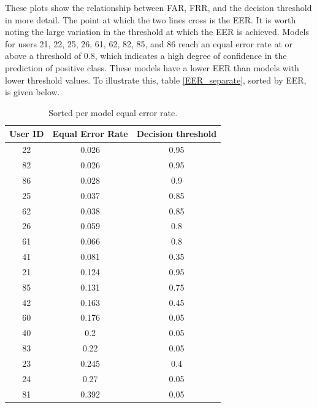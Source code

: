 These plots show the relationship between FAR, FRR, and the decision threshold in more detail. The point at which the two lines cross is the EER. It is worth noting the large variation in the threshold at which the EER is achieved. Models for users 21, 22, 25, 26, 61, 62, 82, 85, and 86 reach an equal error rate at or above a threshold of 0.8, which indicates a high degree of confidence in the prediction of positive class. These models have a lower EER than models with lower threshold values. To illustrate this, table \ref{EER_separate}, sorted by EER, is given below.

\begin{center}
	\begin{table}[H]
		\begin{center}
			\begin{tabular}{ |c|c|c| } 
				\hline
				User ID & Equal Error Rate & Decision threshold \\
				\hline
				\hline
				22 & 0.026 & 0.95 \\
				\hline
				82 & 0.026 & 0.95 \\
				\hline
				86 & 0.028 & 0.9 \\
				\hline
				25 & 0.037 & 0.85 \\
				\hline
				62 & 0.038 & 0.85 \\
				\hline
				26 & 0.059 & 0.8 \\
				\hline
				61 & 0.066 & 0.8 \\
				\hline
				41 & 0.081 & 0.35 \\
				\hline
				21 & 0.124 & 0.95 \\
				\hline
				85 & 0.131 & 0.75 \\
				\hline
				42 & 0.163 & 0.45 \\
				\hline
				60 & 0.176 & 0.05 \\
				\hline
				40 & 0.2 & 0.05 \\
				\hline
				83 & 0.22 & 0.05 \\
				\hline
				23 & 0.245 & 0.4 \\
				\hline
				24 & 0.27 & 0.05 \\
				\hline
				81 & 0.392 & 0.05 \\
				\hline
			\end{tabular}
		\end{center}
		\caption{Sorted per model equal error rate.}
		\label{table:EER_separate_sorted}
	\end{table}
\end{center}

